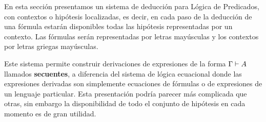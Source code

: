 \documentclass[11pt,letterpaper]{article}
\begin{document}


En esta sección presentamos un sistema de deducción para L\'ogica de 
Predicados, con contextos o hipótesis localizadas, es decir, en cada paso de la 
deducción de una f\'ormula estarán disponibles todas las hipótesis 
representadas por un contexto. Las f\'ormulas ser\'an representadas por letras 
may\'usculas y los contextos por letras griegas may\'usculas.

Este sistema permite construir derivaciones de expresiones de la forma 
$\Gamma\vdash A$ llamados \textbf{secuentes}, a diferencia del sistema de lógica 
ecuacional donde las expresiones derivadas son simplemente ecuaciones 
de fórmulas o de expresiones de un lenguaje particular. 
Esta presentación podría parecer más complicada que otras, sin embargo la 
disponibilidad de todo el conjunto de hipótesis en cada momento es de gran 
utilidad. %
\end{document}
